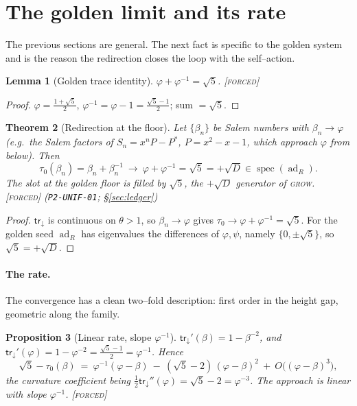 \documentclass[11pt]{article}
\theoremstyle{plain}
\newtheorem{theorem}{Theorem}[section]
\newtheorem{proposition}[theorem]{Proposition}
\newtheorem{lemma}[theorem]{Lemma}
\theoremstyle{definition}
\theoremstyle{remark}
\newcommand{\forced}{\textcolor{forcedc}{\textsc{[forced]}}}
\newcommand{\spec}{\operatorname{spec}}
\newcommand{\ad}{\operatorname{ad}}
\newcommand{\trace}{\mathsf{tr}_{\!\downarrow}}
\begin{document}
\section{The golden limit and its rate}\label{sec:goldenlimit}

The previous sections are general. The next fact is specific to the golden system and is the reason the redirection closes the loop with the self--action.

\begin{lemma}[Golden trace identity]\label{lem:goldentrace}
$\varphi+\varphi^{-1}=\sqrt5$. \forced
\end{lemma}
\begin{proof}
$\varphi=\tfrac{1+\sqrt5}2$, $\varphi^{-1}=\varphi-1=\tfrac{\sqrt5-1}2$; sum $=\sqrt5$.
\end{proof}

\begin{theorem}[Redirection at the floor]\label{thm:goldenlimit}
Let $\{\beta_n\}$ be Salem numbers with $\beta_n\to\varphi$ (e.g.\ the Salem factors of $S_n=x^nP-P^*$, $P=x^2-x-1$, which approach $\varphi$ from below). Then
\[
\tau_0(\beta_n)=\beta_n+\beta_n^{-1}\ \longrightarrow\ \varphi+\varphi^{-1}=\sqrt5=+\sqrt D\in\spec(\ad_R).
\]
The slot at the golden floor is filled by $\sqrt5$, the $+\sqrt D$ generator of \textsc{grow}. \forced{} {\small(\texttt{P2-UNIF-01}; \S\ref{sec:ledger})}
\end{theorem}
\begin{proof}
$\trace$ is continuous on $\theta>1$, so $\beta_n\to\varphi$ gives $\tau_0\to\varphi+\varphi^{-1}=\sqrt5$. For the golden seed $\ad_R$ has eigenvalues the differences of $\varphi,\psi$, namely $\{0,\pm\sqrt5\}$, so $\sqrt5=+\sqrt D$.
\end{proof}

\paragraph{The rate.} The convergence has a clean two--fold description: first order in the height gap, geometric along the family.

\begin{proposition}[Linear rate, slope $\varphi^{-1}$]\label{prop:linrate}
$\trace'(\beta)=1-\beta^{-2}$, and $\trace'(\varphi)=1-\varphi^{-2}=\tfrac{\sqrt5-1}2=\varphi^{-1}$. Hence
\[
\sqrt5-\tau_0(\beta)\ =\ \varphi^{-1}(\varphi-\beta)\ -\ (\sqrt5-2)\,(\varphi-\beta)^2\ +\ O\!\bigl((\varphi-\beta)^3\bigr),
\]
the curvature coefficient being $\tfrac12\trace''(\varphi)=\sqrt5-2=\varphi^{-3}$. The approach is linear with slope $\varphi^{-1}$. \forced
\end{proposition}
\end{document}
